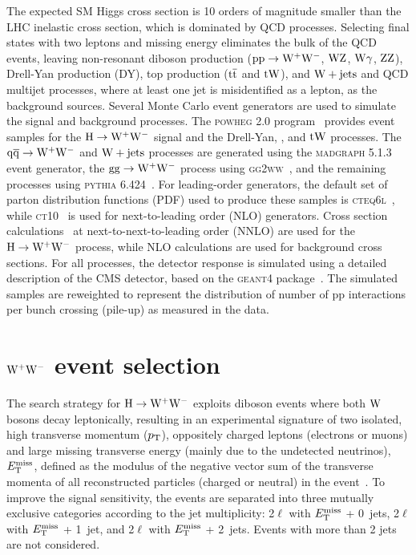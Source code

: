 \documentclass[11pt,twoside,a4paper,cmspaper,final,collab]{cms-tdr}
\begin{document}
The expected SM Higgs cross section is 10 orders of magnitude smaller than the LHC
inelastic cross section, which is dominated by QCD processes.
Selecting final states with two leptons and missing energy eliminates the bulk of the QCD events,
leaving non-resonant diboson production ($\mathrm{p}{}\mathrm{p} \to \mathrm{W^+}{}\mathrm{W^-}$, $\mathrm{W}\mathrm{Z}$, $\mathrm{W}\gamma$, $\mathrm{Z}\mathrm{Z}$), Drell-Yan production (DY),
top production ($\mathrm{t}\overline{\mathrm{t}}$ and $\mathrm{t}\mathrm{W}$), and $\mathrm{W}+\mathrm{jets}$ and QCD multijet
processes, where at least one jet is misidentified as a lepton, as the
background sources.
Several Monte Carlo event generators are used to simulate the signal and background processes.
The \textsc{powheg 2.0} program~\cite{powheg} provides event samples for the $\mathrm{H}\to\mathrm{W^+}{}\mathrm{W^-}$ signal
and the Drell-Yan, \ttbar, and $\mathrm{t}\mathrm{W}$ processes.
The $\mathrm{q}\mathrm{\overline{q}}\to\mathrm{W^+}{}\mathrm{W^-}$ and $\mathrm{W}+\mathrm{jets}$ processes are generated using the \textsc{madgraph 5.1.3}~\cite{madgraph}
event generator, the $\mathrm{g}\mathrm{g} \to \mathrm{W^+}{}\mathrm{W^-}$ process using \textsc{gg2ww}~\cite{ggww}, and the
remaining processes using \textsc{pythia 6.424}~\cite{pythia}.
For leading-order generators, the default set of parton distribution functions
(PDF) used to produce these samples is \textsc{cteq6l}~\cite{cteq66}, while
\textsc{ct10}~\cite{ct10} is used for next-to-leading order (NLO) generators.
Cross section calculations~\cite{LHCHiggsCrossSectionWorkingGroup:2011ti}
at next-to-next-to-leading order (NNLO) are used for the $\mathrm{H}\to\mathrm{W^+}{}\mathrm{W^-}$ process, while NLO
calculations are used for background cross sections.
For all processes, the detector response is simulated using a detailed
description of the CMS detector, based on the \textsc{geant4}
package~\cite{Agostinelli:2002hh}.
The simulated samples are reweighted to represent the distribution of number of
pp interactions per bunch crossing (pile-up) as measured in the data.

\section{\texorpdfstring{$\mathrm{W^+}{}\mathrm{W^-}$}{WW} event selection}
\label{sec:ww_evtsel}

The search strategy for $\mathrm{H}\to\mathrm{W^+}{}\mathrm{W^-}$ exploits diboson events where
both $\mathrm{W}$ bosons decay leptonically, resulting in
an experimental signature of two isolated,
high transverse momentum ($p_{\mathrm{T}}$), oppositely charged leptons (electrons or muons) and large
missing transverse energy (mainly due to the undetected neutrinos), $E_{\mathrm{T}}^{\text{miss}}$, defined
as the modulus of the negative vector sum of the transverse momenta
of all reconstructed particles (charged or neutral) in the event~\cite{PFT-09-001}.
To improve the signal sensitivity,
the events are separated into three mutually exclusive categories according to the jet
multiplicity: 2$\ell$ with $E_{\mathrm{T}}^{\text{miss}}$ + 0~jets, 2$\ell$ with $E_{\mathrm{T}}^{\text{miss}}$ + 1~jet, and
2$\ell$ with $E_{\mathrm{T}}^{\text{miss}}$ + 2~jets. Events with more than 2 jets are not considered.
\end{document}
